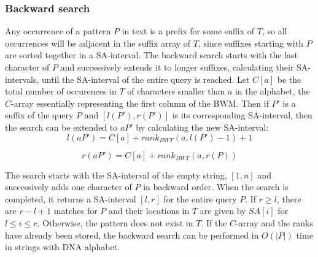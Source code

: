 \documentclass[runningheads,a4paper]{llncs}
\begin{document}
\subsubsection{Backward search}
Any occurrence of a pattern $P$ in text is a prefix for some suffix of $T$, so all occurrences will be adjacent in the suffix array of $T$, since suffixes starting with $P$ are sorted together in a SA-interval. The backward search starts with the last character of $P$ and successively extends it to longer suffixes, calculating their SA-intervals, until the SA-interval of the entire query is reached. Let $C[a]$ be the total number of occurences in $T$ of characters smaller than $a$ in the alphabet, the $C$-array essentially representing the first column of the BWM. Then if $P'$ is a suffix of the query $P$ and $[l(P'),r(P')]$ is its corresponding SA-interval, then the search can be extended to $aP'$ by calculating the new SA-interval:
\newline
\begin{equation} 
l(aP')=C[a]+rank_{BWT}(a,l(P')-1)+1 
\end{equation} 

\begin{equation} 
r(aP')=C[a]+rank_{BWT}(a,r(P))
\end{equation}

The search starts with the SA-interval of the empty string, $[1,n]$ and successively adds one character of $P$ in backward order. When the search is completed, it returns a SA-interval $[l,r]$ for the entire query $P$. If $r \geq l$, there are $r-l+1$ matches for $P$ and their locations in $T$ are given by $SA[i]$ for $l \leq i \leq r$. Otherwise, the pattern does not exist in $T$. If the $C$-array and the ranks have already been stored, the backward search can be performed in $O(|P|)$ time in strings with DNA alphabet.
\end{document}
